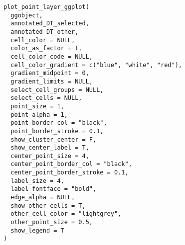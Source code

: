 \documentclass[a4paper]{book}
\begin{document}
\begin{Usage}
\begin{verbatim}
plot_point_layer_ggplot(
  ggobject,
  annotated_DT_selected,
  annotated_DT_other,
  cell_color = NULL,
  color_as_factor = T,
  cell_color_code = NULL,
  cell_color_gradient = c("blue", "white", "red"),
  gradient_midpoint = 0,
  gradient_limits = NULL,
  select_cell_groups = NULL,
  select_cells = NULL,
  point_size = 1,
  point_alpha = 1,
  point_border_col = "black",
  point_border_stroke = 0.1,
  show_cluster_center = F,
  show_center_label = T,
  center_point_size = 4,
  center_point_border_col = "black",
  center_point_border_stroke = 0.1,
  label_size = 4,
  label_fontface = "bold",
  edge_alpha = NULL,
  show_other_cells = T,
  other_cell_color = "lightgrey",
  other_point_size = 0.5,
  show_legend = T
)
\end{verbatim}
\end{Usage}
%
\end{document}
